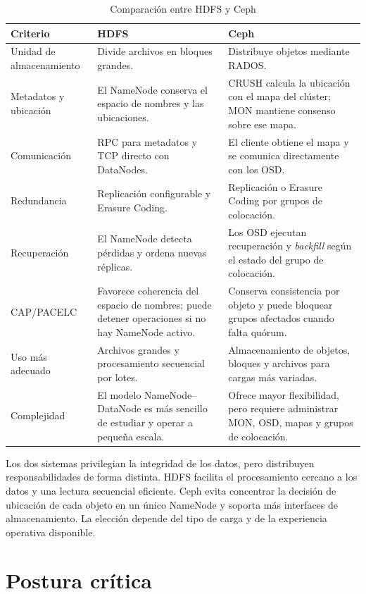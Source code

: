 \documentclass[12pt,a4paper]{article}
\begin{document}
\begin{table}[htbp]
  \centering
  \caption{Comparación entre HDFS y Ceph}
  \label{tab:comparacion}
  \renewcommand{\arraystretch}{1.2}
  \begin{tabular}{p{3.1cm}p{5.2cm}p{5.2cm}}
    \toprule
    \textbf{Criterio} & \textbf{HDFS} & \textbf{Ceph} \\
    \midrule
    Unidad de almacenamiento & Divide archivos en bloques grandes. & Distribuye objetos mediante RADOS. \\
    Metadatos y ubicación & El NameNode conserva el espacio de nombres y las ubicaciones. & CRUSH calcula la ubicación con el mapa del clúster; MON mantiene consenso sobre ese mapa. \\
    Comunicación & RPC para metadatos y TCP directo con DataNodes. & El cliente obtiene el mapa y se comunica directamente con los OSD. \\
    Redundancia & Replicación configurable y Erasure Coding. & Replicación o Erasure Coding por grupos de colocación. \\
    Recuperación & El NameNode detecta pérdidas y ordena nuevas réplicas. & Los OSD ejecutan recuperación y \textit{backfill} según el estado del grupo de colocación. \\
    CAP/PACELC & Favorece coherencia del espacio de nombres; puede detener operaciones si no hay NameNode activo. & Conserva consistencia por objeto y puede bloquear grupos afectados cuando falta quórum. \\
    Uso más adecuado & Archivos grandes y procesamiento secuencial por lotes. & Almacenamiento de objetos, bloques y archivos para cargas más variadas. \\
    Complejidad & El modelo NameNode--DataNode es más sencillo de estudiar y operar a pequeña escala. & Ofrece mayor flexibilidad, pero requiere administrar MON, OSD, mapas y grupos de colocación. \\
    \bottomrule
  \end{tabular}
\end{table}

Los dos sistemas privilegian la integridad de los datos, pero distribuyen responsabilidades de forma distinta. HDFS facilita el procesamiento cercano a los datos y una lectura secuencial eficiente. Ceph evita concentrar la decisión de ubicación de cada objeto en un único NameNode y soporta más interfaces de almacenamiento. La elección depende del tipo de carga y de la experiencia operativa disponible.

\section{Postura crítica}
\end{document}
